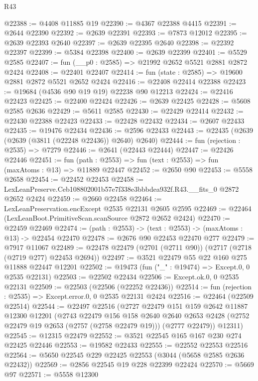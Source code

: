 \begin{lexlean}{R43}
\begin{coremodule}
@22388 := @4408 @11885 @19
@22390 := @4367 @22388 @4415
@22391 := @2644 @22390
@22392 := @2639 @22391
@22393 := @7873 @12012
@22395 := @2639 @22393 @2640
@22397 := @2639 @22395 @2640
@22398 := @22392 @22397
@22399 := @5384 @22398
@22400 := @2639 @22399
@22401 := @5529 @2585
@22407 := fun (__p0 : @2585) => @21992 @2652 @5521 @2881 @2872 @2424
@22408 := @22401 @22407
@22414 := fun (state : @2585) => @19600 @2881 @2872 @5521 @2652 @2424
@22416 := @22408 @22414 @22388
@22423 := @19684 (@4536 @90 @19 @19) @22238 @90 @12213
@22424 := @22416 @22423
@22425 := @22400 @22424
@22426 := @2639 @22425
@22428 := @5608 @2585 @2636
@22429 := @5611 @2585
@22430 := @22429 @22414
@22432 := @22430 @22388 @22423
@22433 := @22428 @22432
@22434 := @2607 @22433
@22435 := @19476 @22434
@22436 := @2596 @22433
@22443 := @22435 (@2639 (@2639 (@3811 (@22248 @22436)) @2640) @2640)
@22444 := fun (rejection : @2535) => @7279
@22446 := @2641 (@22443 @22444)
@22447 := @22426 @22446
@22451 := fun (path : @2553) => fun (text : @2553) => fun (maxAtoms : @13) => @11889 @22447
@22452 := @2650 @90
@22453 := @5558 @2658
@22454 := @22452 @22453
@22458 := LexLeanPreserve.Ceb108802001b57e7f338e3bbbdea932f.R43.__fits_0 @2872 @2652 @2424
@22459 := @2660 @22458
@22464 := LexLeanPreservation.encExcept @2535 @22131 @2605 @2595
@22469 := @22464 (LexLeanBoot.PrimitiveScan.scanSource @2872 @2652 @2424)
@22470 := @22459 @22469
@22474 := (path : @2553) -> (text : @2553) -> (maxAtoms : @13) -> @22454 @22470
@22478 := @2676 @90 @22453 @22470 @277
@22479 := @7917 @11067
@22489 := @22478 @22479 (@2701 (@2711 @90)) (@2717 (@2718 (@2719 @277) @22453 @2694))
@22497 := @3521 @22479 @55 @22 @160 @275 @11888 @22447 @12201
@22502 := @19473 (fun ("_" : @19474) => Except.{0, 0} @2535 @22131)
@22503 := @22502 @22434
@22506 := Except.ok.{0, 0} @2535 @22131
@22509 := @22503 (@22506 (@22252 @22436))
@22514 := fun (rejection : @2535) => Except.error.{0, 0} @2535 @22131 @2424
@22516 := @22464 (@22509 @22514)
@22544 := @22497
    @22516
    (@2727
      @22479
      @151
      @159
      @2642
      @11887
      @12300
      @12201
      (@2743
        @22479
        @156
        @158
        @2640
        @2640
        @2653
        @2428
        (@2752 @22479 @19 @2653 (@2757 (@2758 @22479 @19)))
        (@2777 @22479))
      @12311)
@22545 := @12315 @22479
@22552 := @3521 @22545 @165 @167 @230 @274 @22425 @22446
@22553 := @19582 @22433
@22555 := @22552 @22553 @22516
@22564 := @5650 @22545 @229 @22425 @22553 (@3044 (@5658 @2585 @2636 @22432))
@22569 := @2856 @22545 @19 @228 @22399 @22424
@22570 := @5669 @97
@22571 := @5558 @12300

\end{coremodule}
\end{lexlean}
